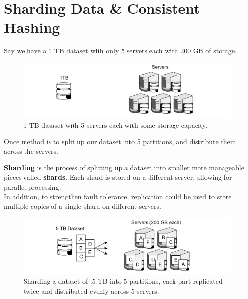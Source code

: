 \newpage 

\section{Sharding Data \& Consistent Hashing}
\label{sec:shard}

Say we have a 1 TB dataset with only 5 servers each with 200 GB of storage.

\begin{figure}[h]

    \centering
    \includegraphics[width=\textwidth]{Sections/shard/server.png}
    \caption{1 TB dataset with 5 servers each with some storage capacity.}
    \label{fig:shard}
\end{figure}

\noindent
Once method is to split up our dataset into 5 partitions, and distribute them across the servers.
\begin{Def}[Sharding]

    \textbf{Sharding} is the process of splitting up a dataset into smaller more manageable pieces called \textbf{shards}. Each shard is stored on a different server, allowing for parallel processing.\\

    \noindent
    In addition, to strengthen fault tolerance, replication could be used to store multiple copies of a single shard on different servers.
\end{Def}

\begin{figure}[h]

    \centering
    \includegraphics[width=\textwidth]{Sections/shard/shard.png}
    \caption{Sharding a dataset of .5 TB into 5 partitions, each part replicated twice and distributed evenly across 5 servers.}
    \label{fig:shard}
\end{figure}

